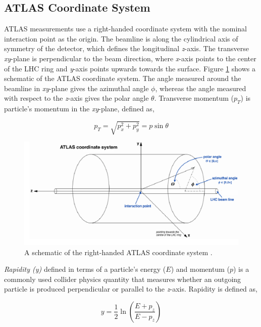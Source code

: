 \subsection{ATLAS Coordinate System}
\label{subsec:ATLASCS}

ATLAS measurements use a right-handed coordinate system with the nominal interaction point as the origin. The beamline is along the cylindrical axis of symmetry of the detector, which defines the longitudinal \textit{z}-axis. The transverse \textit{xy}-plane is perpendicular to the beam direction, where \textit{x}-axis points to the center of the LHC ring and \textit{y}-axis points upwards towards the surface. Figure \ref{fig:ATLAS_CS} shows a schematic of the ATLAS coordinate system. The angle measured around the beamline in \textit{xy}-plane gives the azimuthal angle $\phi$, whereas the angle measured with respect to the \textit{z}-axis gives the polar angle $\theta$. Transverse momentum ($p_{T}$) is particle's momentum in the \textit{xy}-plane, defined as, 

\begin{equation}
p_{T} = \sqrt{p_{x}^2+p_{y}^2}=p\sin\theta
\label{eqn:pT}
\end{equation}
\begin{figure}
    \centering
    \includegraphics[width=.98\linewidth]{figures/LHC/ATLAS_CoordinateSys.png}
    \caption{ A schematic of the right-handed ATLAS coordinate system \cite{ATLAS_CoordSys}.\label{fig:ATLAS_CS}}
\end{figure}

\textit{Rapidity (y)} defined in terms of a particle's energy ($E$) and momentum ($p$) is a commonly used collider physics quantity that measures whether an outgoing particle is produced perpendicular or parallel to the \textit{z}-axis. Rapidity is defined as, 

\begin{equation}
    y = \frac{1}{2}\ln{ \left( \frac{E+p_{z}}{E-p_{z}} \right) }
    \label{eqn:Rapidity}
\end{equation}

